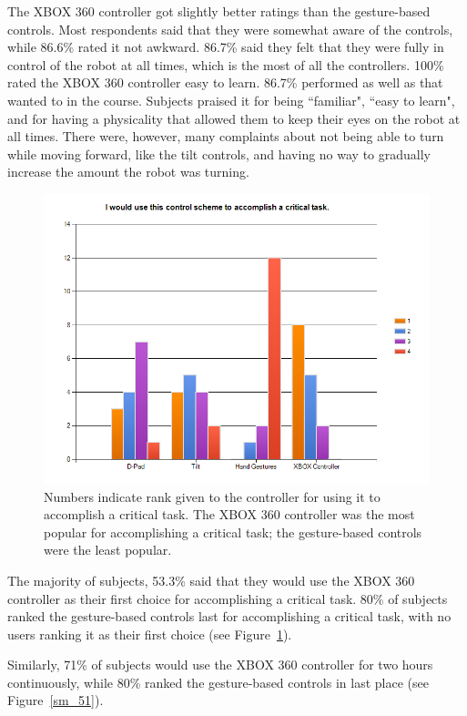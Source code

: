 \documentclass[12pt,a4paper]{report}
\begin{document}
The XBOX 360 controller got slightly better ratings than the gesture-based controls. Most respondents said that they were somewhat aware of the controls, while 86.6\% rated it not awkward. 86.7\% said they felt that they were fully in control of the robot at all times, which is the most of all the controllers. 100\% rated the XBOX 360 controller easy to learn. 86.7\% performed as well as that wanted to in the course. Subjects praised it for being ``familiar", ``easy to learn", and for having a physicality that allowed them to keep their eyes on the robot at all times. There were, however, many complaints about not being able to turn while moving forward, like the tilt controls, and having no way to gradually increase the amount the robot was turning. 

\begin{figure}[h!]
	\centering
	\includegraphics[width=5in]{images/sm_50.png}
	\caption{Numbers indicate rank given to the controller for using it to accomplish a critical task. The XBOX 360 controller was the most popular for accomplishing a critical task; the gesture-based controls were the least popular.}
	\label{sm_50}
\end{figure}

The majority of subjects, 53.3\% said that they would use the XBOX 360 controller as their first choice for accomplishing a critical task. 80\% of subjects ranked the gesture-based controls last for accomplishing a critical task, with no users ranking it as their first choice (see Figure~\ref{sm_50}).

Similarly, 71\% of subjects would use the XBOX 360 controller for two hours continuously, while 80\% ranked the gesture-based controls in last place (see Figure~\ref{sm_51}).
\end{document}
